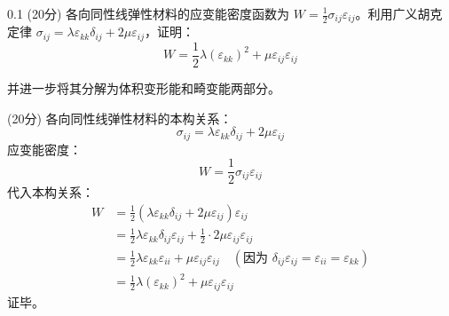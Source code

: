\begin{question}{0.1}
    (20分) 各向同性线弹性材料的应变能密度函数为 \( W = \frac{1}{2}\sigma_{ij}\varepsilon_{ij} \)。利用广义胡克定律 \( \sigma_{ij} = \lambda \varepsilon_{kk}\delta_{ij} + 2\mu \varepsilon_{ij} \)，证明：
$$
W = \frac{1}{2}\lambda (\varepsilon_{kk})^2 + \mu \varepsilon_{ij}\varepsilon_{ij}
$$

并进一步将其分解为体积变形能和畸变能两部分。
\end{question}

\begin{solution}
    (20分) 各向同性线弹性材料的本构关系：
$$
\sigma_{ij} = \lambda \varepsilon_{kk} \delta_{ij} + 2\mu \varepsilon_{ij}
$$
应变能密度：
$$
W = \frac{1}{2}\sigma_{ij}\varepsilon_{ij}
$$
代入本构关系：
$$
\begin{aligned}
W &= \frac{1}{2} \left( \lambda \varepsilon_{kk} \delta_{ij} + 2\mu \varepsilon_{ij} \right) \varepsilon_{ij} \\
&= \frac{1}{2} \lambda \varepsilon_{kk} \delta_{ij} \varepsilon_{ij} + \frac{1}{2} \cdot 2\mu \varepsilon_{ij} \varepsilon_{ij} \\
&= \frac{1}{2} \lambda \varepsilon_{kk} \varepsilon_{ii} + \mu \varepsilon_{ij} \varepsilon_{ij} \quad (\text{因为 } \delta_{ij}\varepsilon_{ij} = \varepsilon_{ii} = \varepsilon_{kk}) \\
&= \frac{1}{2} \lambda (\varepsilon_{kk})^2 + \mu \varepsilon_{ij} \varepsilon_{ij}
\end{aligned}
$$
证毕。
\end{solution}

